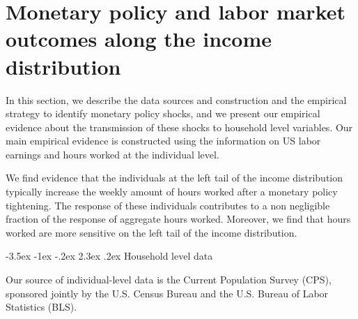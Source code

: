 \documentclass[a4paper,12pt]{article}%
\makeatletter
\renewcommand\subsection{\@startsection {subsection}{2}{\z@}%
                  {-3.5ex \@plus -1ex \@minus -.2ex}%
                  {2.3ex \@plus.2ex}%
                  {\centering\normalsize\scshape\color{black}}}
\makeatother
\begin{document}
\section{Monetary policy and labor market outcomes along the income distribution}\label{T:Empirics}

In this section, we describe the data sources and construction and the empirical strategy to identify monetary policy shocks, and we present our empirical evidence about the transmission of these shocks to household level variables. Our main empirical evidence is constructed using the information on US labor earnings and hours worked at the individual level.%

We find evidence that the individuals at the left tail of the income distribution typically increase the weekly amount of hours worked after a monetary policy tightening. The response of these individuals contributes to a non negligible fraction of the response of aggregate hours worked. 
Moreover, we find that hours worked are more sensitive on the left tail of the income distribution. 



\subsection{Household level data}\label{T:Empirics:HH}

Our source of individual-level data is the Current Population Survey (CPS), sponsored jointly by the U.S. Census Bureau and the U.S. Bureau of Labor Statistics (BLS).
\end{document}
